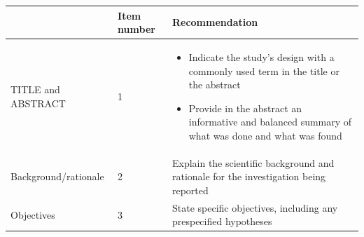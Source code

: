 \documentclass[]{book}
\providecommand{\tightlist}{%
  \setlength{\itemsep}{0pt}\setlength{\parskip}{0pt}}
\begin{document}
\begin{longtable}[]{@{}lll@{}}
\toprule
\begin{minipage}[b]{0.34\columnwidth}\raggedright
\strut
\end{minipage} & \begin{minipage}[b]{0.17\columnwidth}\raggedright
Item number\strut
\end{minipage} & \begin{minipage}[b]{0.40\columnwidth}\raggedright
Recommendation\strut
\end{minipage}\tabularnewline
\midrule
\endhead
\begin{minipage}[t]{0.34\columnwidth}\raggedright
TITLE and ABSTRACT\strut
\end{minipage} & \begin{minipage}[t]{0.17\columnwidth}\raggedright
1\strut
\end{minipage} & \begin{minipage}[t]{0.40\columnwidth}\raggedright
\begin{itemize}
\tightlist
\item
  Indicate the study's design
  with a commonly used term in
  the title or the abstract
\item
  Provide in the abstract an
  informative and balanced
  summary of what was done and
  what was found
\end{itemize}\strut
\end{minipage}\tabularnewline
\begin{minipage}[t]{0.34\columnwidth}\raggedright
Background/rationale\strut
\end{minipage} & \begin{minipage}[t]{0.17\columnwidth}\raggedright
2\strut
\end{minipage} & \begin{minipage}[t]{0.40\columnwidth}\raggedright
Explain the scientific
background and rationale for
the investigation being
reported\strut
\end{minipage}\tabularnewline
\begin{minipage}[t]{0.34\columnwidth}\raggedright
Objectives\strut
\end{minipage} & \begin{minipage}[t]{0.17\columnwidth}\raggedright
3\strut
\end{minipage} & \begin{minipage}[t]{0.40\columnwidth}\raggedright
State specific objectives,
including any prespecified
hypotheses\strut
\end{minipage}\tabularnewline

\end{longtable}
\end{document}
